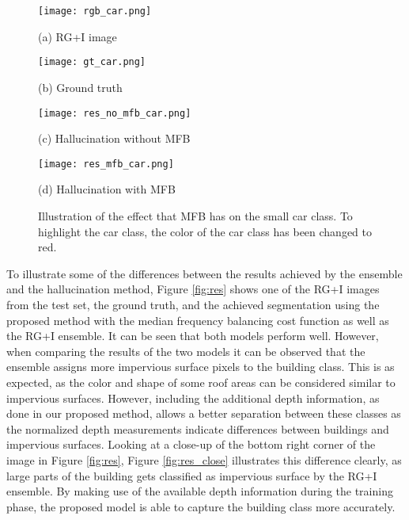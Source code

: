\documentclass[journal]{IEEEtran}
\begin{document}
\begin{figure}[htbp]
\begin{minipage}[b]{0.48\linewidth}
  \centering
 \texttt{[image: rgb\_car.png]}
  \centerline{(a) RG+I image}\medskip
\end{minipage}
\hfill
\begin{minipage}[b]{0.48\linewidth}
  \centering
 \texttt{[image: gt\_car.png]}
  \centerline{(b) Ground truth}\medskip
\end{minipage}
\begin{minipage}[b]{0.48\linewidth}
  \centering
 \texttt{[image: res\_no\_mfb\_car.png]}
  \centerline{(c) Hallucination without MFB}\medskip
\end{minipage}
\hfill
\begin{minipage}[b]{0.48\linewidth}
  \centering
 \texttt{[image: res\_mfb\_car.png]}
  \centerline{(d) Hallucination with MFB}\medskip
\end{minipage}
\caption{Illustration of the effect that MFB has on the small car class. To highlight the car class, the color of the car class has been changed to red.}
\label{fig:res_mfb}
\end{figure}

To illustrate some of the differences between the results achieved by the ensemble and the hallucination method, Figure \ref{fig:res} shows one of the RG+I images from the test set, the ground truth, and the achieved segmentation using the proposed method with the median frequency balancing cost function  as well as the RG+I ensemble. It can be seen that both models perform well. However, when comparing the results of the two models it can be observed that the ensemble assigns more impervious surface pixels to the building class. This is as expected, as the color and shape of some roof areas can be considered similar to impervious surfaces. However, including the additional depth information, as done in our proposed method, allows a better separation between these classes as the normalized depth measurements indicate differences between buildings and impervious surfaces. Looking at a close-up of the bottom right corner of the image in Figure \ref{fig:res}, Figure \ref{fig:res_close} illustrates this difference clearly, as large parts of the building gets classified as impervious surface by the RG+I ensemble. By making use of the available depth information during the training phase, the proposed model is able to capture the building class more accurately.
\end{document}
